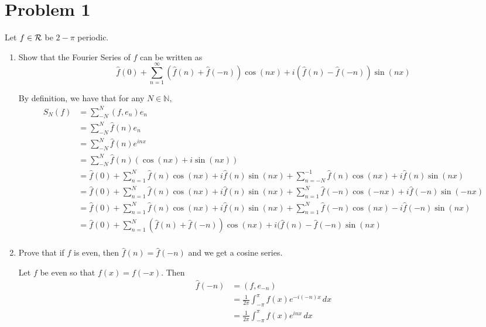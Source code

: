 \documentclass[11pt]{article}
\newcommand{\bbN}{\mathbb{N}}
\begin{document}
	
	
	\psetheader

\section*{Problem 1}
\begin{problem}
    Let $f \in \cal R$ be $2-\pi$ periodic. 
    \begin{enumerate}
        \item Show that the Fourier Series of $f$ can be written as 
        \[\hat{f}(0) + \sum_{n=1}^\infty (\hat{f}(n) + \hat{f}(-n))\cos(nx) + i(\hat{f}(n) - \hat{f}(-n))\sin(nx) \]
        \begin{solution}
        By definition, we have that for any $N \in \bbN,$
\begin{align*}
    S_N(f) &= \sum_{-N}^N (f,e_n)e_n\\
    &= \sum_{-N}^N \hat{f}(n)e_n\\
    &= \sum_{-N}^N\hat{f}(n)e^{inx}\\
    &= \sum_{-N}^N \hat{f}(n)(\cos(nx) + i\sin(nx))\\
    &= \hat{f}(0) + \sum_{n=1}^N \hat{f}(n)\cos(nx) + i\hat{f}(n)\sin(nx) + \sum_{n= -N}^{-1}\hat{f}(n)\cos(nx) + i\hat{f}(n)\sin(nx)\\
    &= \hat{f}(0) + \sum_{n=1}^N \hat{f}(n)\cos(nx) + i\hat{f}(n)\sin(nx) + \sum_{n= 1}^{N}\hat{f}(-n)\cos(-nx) + i\hat{f}(-n)\sin(-nx)\\
    &= \hat{f}(0) + \sum_{n=1}^N \hat{f}(n)\cos(nx) + i\hat{f}(n)\sin(nx) + \sum_{n= 1}^{N}\hat{f}(-n)\cos(nx) - i\hat{f}(-n)\sin(nx)\\
    &=\hat{f}(0) + \sum_{n=1}^N (\hat{f}(n) + \hat{f}(-n))\cos(nx) + i(\hat{f} (n) - \hat{f}(-n)\sin(nx)\\
\end{align*}
        \end{solution}
    \item Prove that if $f$ is even, then $\hat{f}(n) = \hat{f}(-n)$ and we get a cosine series.
    \begin{solution}
        Let $f$ be even so that $f(x) = f(-x).$ Then 
        \begin{align*}
    \hat{f}(-n) &= (f,e_{-n})\\
    &= \frac{1}{2\pi}\int_{-\pi}^{\pi} f(x)e^{-i(-n)x}\,dx\\
    &= \frac{1}{2\pi}\int_{-\pi}^{\pi} f(x)e^{inx}\,dx\\

\end{align*}
\end{solution}
\end{enumerate}
\end{problem}
\end{document}
